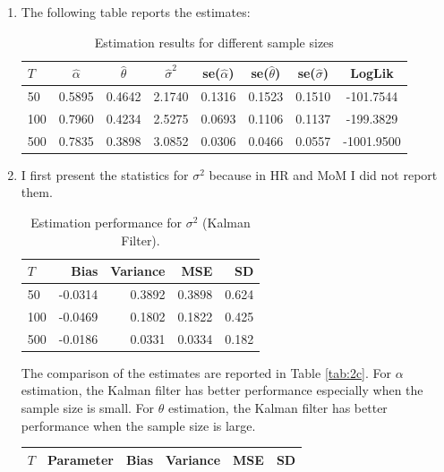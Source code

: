 \documentclass[12pt]{article}
\begin{document}
\begin{enumerate}[label=\alph*.]
    \item The following table reports the estimates:
    \begin{table}[htbp]
        \centering
        \begin{tabular}{lccccccc}
            \toprule
            $T$ & $\hat{\alpha}$ & $\hat{\theta}$ &  $\hat{\sigma}^2$ & se($\hat{\alpha}$) & se($\hat{\theta}$) & se($\hat{\sigma}$) & LogLik \\
            \midrule
            50  & 0.5895 & 0.4642 & 2.1740 & 0.1316 & 0.1523 & 0.1510 & -101.7544 \\
            100 & 0.7960 & 0.4234 & 2.5275 & 0.0693 & 0.1106 & 0.1137 & -199.3829 \\
            500 & 0.7835 & 0.3898 & 3.0852 & 0.0306 & 0.0466 & 0.0557 & -1001.9500 \\
            \bottomrule
        \end{tabular}
        \caption{Estimation results for different sample sizes}
    \end{table}

    \newpage
    \item I first present the statistics for $\sigma^2$ because in HR and MoM I did not report them.
    \begin{table}[htbp]
        \centering
        \begin{tabular}{lrrrr}
        \toprule
        $T$ & Bias & Variance & MSE & SD \\
        \midrule
        50  & -0.0314 & 0.3892 & 0.3898 & 0.624 \\
        100 & -0.0469 & 0.1802 & 0.1822 & 0.425 \\
        500 & -0.0186 & 0.0331 & 0.0334 & 0.182 \\
        \bottomrule
        \end{tabular}
        \caption{Estimation performance for $\sigma^2$ (Kalman Filter).}
        \end{table}
    
    
        The comparison of the estimates are reported in Table \ref{tab:2c}. For $\alpha$ estimation, the Kalman filter has better performance especially when the sample size is small. For $\theta$ estimation, the Kalman filter has better performance when the sample size is large. 
    \begin{table}[htbp]
        \centering
        \begin{tabular}{lrrrrr}
        \toprule
        $T$ & Parameter & Bias & Variance & MSE & SD \\
        \midrule
        

\end{tabular}
\end{table}
\end{enumerate}
\end{document}
